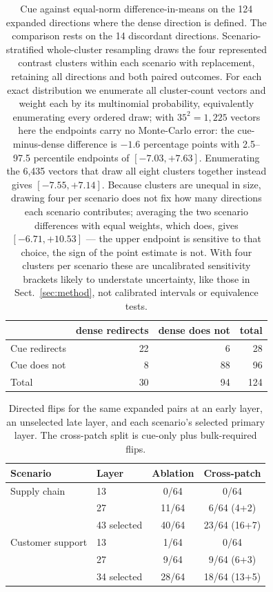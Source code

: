 \documentclass{article}
\begin{document}
\begin{table}[h]
\caption{Cue against equal-norm difference-in-means on the 124 expanded
directions where the dense direction is defined. The comparison rests on the 14
discordant directions. Scenario-stratified whole-cluster resampling draws the
four represented contrast clusters within each scenario with replacement,
retaining all directions and both paired outcomes. For each exact distribution we enumerate all
cluster-count vectors and weight each by its multinomial probability,
equivalently enumerating every ordered draw; with $35^2=1{,}225$ vectors here
the endpoints carry no Monte-Carlo error: the cue-minus-dense
difference is $-1.6$ percentage points with 2.5--97.5 percentile endpoints of
$[-7.03,+7.63]$. Enumerating the 6,435 vectors that draw all eight clusters
together instead gives $[-7.55,+7.14]$. Because clusters are unequal in size,
drawing four per scenario does not fix how many directions each scenario
contributes; averaging the two scenario differences with equal weights, which
does, gives $[-6.71,+10.53]$ --- the upper endpoint is sensitive to that
choice, the sign of the point estimate is not. With four clusters per scenario
these are uncalibrated sensitivity brackets likely to understate uncertainty,
like those in Sect.~\ref{sec:method}, not calibrated intervals or equivalence
tests.}
\label{tab:discordance}
\centering
\small
\setlength{\tabcolsep}{6pt}
\begin{tabular}{@{}lrrr@{}}
\toprule
 & dense redirects & dense does not & total \\
\midrule
Cue redirects        & 22 & 6  & 28  \\
Cue does not         & 8  & 88 & 96  \\
\midrule
Total                & 30 & 94 & 124 \\
\bottomrule
\end{tabular}
\end{table}

\begin{table}[h]
\caption{Directed flips for the same expanded pairs at an early layer, an
unselected late layer, and each scenario's selected primary layer. The
cross-patch split is cue-only plus bulk-required flips.}
\label{tab:expanded}
\centering
\small
\setlength{\tabcolsep}{5pt}
\begin{tabular}{@{}llcc@{}}
\toprule
Scenario & Layer & Ablation & Cross-patch \\
\midrule
Supply chain     & 13          & 0/64  & 0/64 \\
                 & 27          & 11/64 & 6/64 (4+2) \\
                 & 43 selected & 40/64 & 23/64 (16+7) \\
\addlinespace
Customer support & 13          & 1/64  & 0/64 \\
                 & 27          & 9/64  & 9/64 (6+3) \\
                 & 34 selected & 28/64 & 18/64 (13+5) \\
\bottomrule
\end{tabular}
\end{table}
\end{document}
